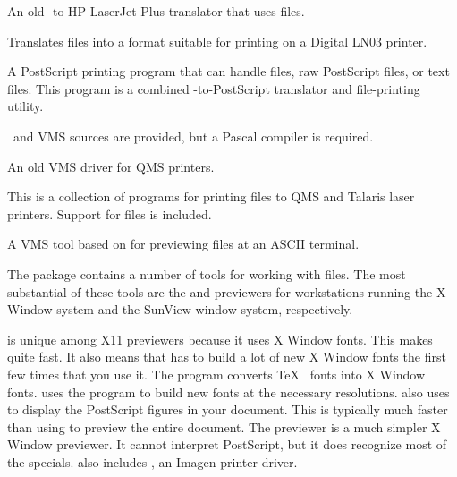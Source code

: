 An old -to-HP LaserJet Plus translator that uses 
files.


Translates  files into a format suitable for printing on
a Digital LN03 printer.


A PostScript printing program that can handle  files, raw
PostScript files, or text files.  This program is a combined 
-to-PostScript translator and file-printing utility.

\Unix\ and VMS sources are provided, but a Pascal compiler is required.


An old VMS  driver for QMS printers.


This is a collection of programs for printing files to QMS and Talaris laser
printers.  Support for  files is included.


A VMS tool based on  for previewing  files
at an ASCII terminal.


The  package contains a number of tools for working
with  files.  The most substantial of these tools are the
 and  previewers for workstations
running the X Window system and the SunView window system, respectively.

 is unique among X11 previewers because it uses X Window
fonts.  This makes  quite fast.  It also means that 
 has to build a lot of new X Window fonts the first
few times that you use it.  The  program converts
\TeX\  fonts into X Window fonts.   uses the
 program to build new  fonts at the
necessary resolutions.
 also uses  to display the PostScript
figures in your document.  This is typically much faster than using
 to preview the entire document. 
The  previewer is a much simpler X Window previewer.
It cannot interpret PostScript, but it does recognize most of the 
 specials.
 also includes 
,
an Imagen printer driver.

